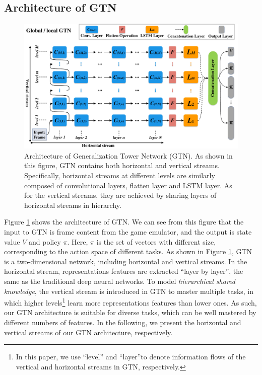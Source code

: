 \documentclass[letterpaper]{article} %
\begin{document}
\subsection{Architecture of GTN}
\label{section-archi-of-gtn}

\begin{figure}
	\begin{center}
		\centerline{\includegraphics[width=\columnwidth]{figure/figure-main-framework}}
		\caption{
			Architecture of Generalization Tower Network (GTN).
			As shown in this figure, GTN contains both horizontal and vertical streams.
			Specifically, horizontal streams at different levels are similarly composed of convolutional layers, flatten layer and LSTM layer.
			As for the vertical streams, they are achieved by sharing layers of horizontal streams in hierarchy.
		}
		\label{figure-main-framework}
	\end{center}
\end{figure}

Figure \ref{figure-main-framework} shows the architecture of GTN.
We can see from this figure that the input to GTN is frame content from the game emulator, and the output is state value $V$ and policy $\pi$.
Here, $\pi$ is the set of vectors with different size, corresponding to the action space of different tasks.
As shown in Figure \ref{figure-main-framework}, GTN is a two-dimensional network, including horizontal and vertical streams.
In the horizontal stream, representations features are extracted ``layer by layer'', the same as the traditional deep neural networks. To model \textit{hierarchical shared knowledge}, the vertical stream is introduced in GTN to master multiple tasks, in which higher levels\footnote{In this paper, we use ``level'' and ``layer''to denote information flows of the vertical and horizontal streams in GTN, respectively. } learn more representations features than lower ones.
As such, our GTN architecture is suitable for diverse tasks, which can be well mastered by different numbers of features.
In the following, we present the horizontal and vertical streams of our GTN architecture, respectively.
\end{document}
